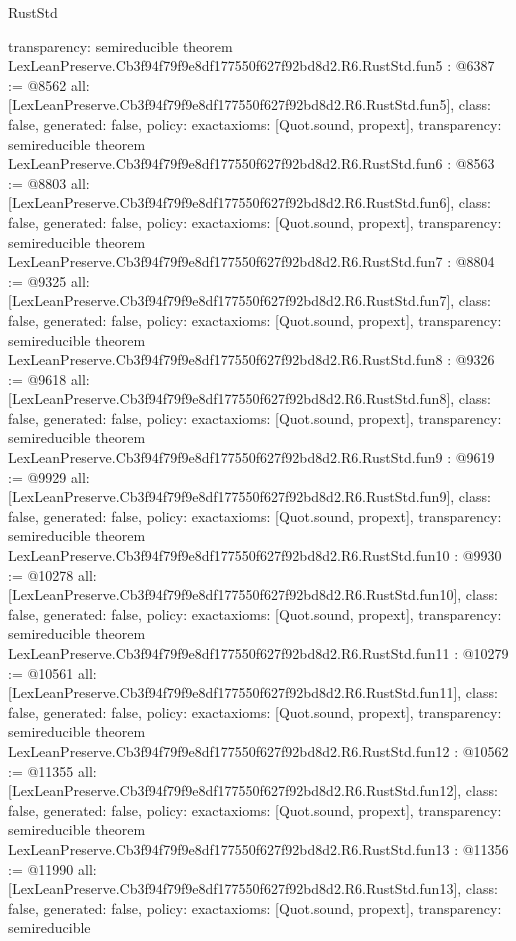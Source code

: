 \begin{lexlean}{RustStd}
\begin{coremodule}
{  transparency: semireducible
}
theorem LexLeanPreserve.Cb3f94f79f9e8df177550f627f92bd8d2.R6.RustStd.fun5 : @6387 := @8562 {
  all: [LexLeanPreserve.Cb3f94f79f9e8df177550f627f92bd8d2.R6.RustStd.fun5],
  class: false,
  generated: false,
  policy: exact{axioms: [Quot.sound, propext]},
  transparency: semireducible
}
theorem LexLeanPreserve.Cb3f94f79f9e8df177550f627f92bd8d2.R6.RustStd.fun6 : @8563 := @8803 {
  all: [LexLeanPreserve.Cb3f94f79f9e8df177550f627f92bd8d2.R6.RustStd.fun6],
  class: false,
  generated: false,
  policy: exact{axioms: [Quot.sound, propext]},
  transparency: semireducible
}
theorem LexLeanPreserve.Cb3f94f79f9e8df177550f627f92bd8d2.R6.RustStd.fun7 : @8804 := @9325 {
  all: [LexLeanPreserve.Cb3f94f79f9e8df177550f627f92bd8d2.R6.RustStd.fun7],
  class: false,
  generated: false,
  policy: exact{axioms: [Quot.sound, propext]},
  transparency: semireducible
}
theorem LexLeanPreserve.Cb3f94f79f9e8df177550f627f92bd8d2.R6.RustStd.fun8 : @9326 := @9618 {
  all: [LexLeanPreserve.Cb3f94f79f9e8df177550f627f92bd8d2.R6.RustStd.fun8],
  class: false,
  generated: false,
  policy: exact{axioms: [Quot.sound, propext]},
  transparency: semireducible
}
theorem LexLeanPreserve.Cb3f94f79f9e8df177550f627f92bd8d2.R6.RustStd.fun9 : @9619 := @9929 {
  all: [LexLeanPreserve.Cb3f94f79f9e8df177550f627f92bd8d2.R6.RustStd.fun9],
  class: false,
  generated: false,
  policy: exact{axioms: [Quot.sound, propext]},
  transparency: semireducible
}
theorem LexLeanPreserve.Cb3f94f79f9e8df177550f627f92bd8d2.R6.RustStd.fun10 : @9930 := @10278 {
  all: [LexLeanPreserve.Cb3f94f79f9e8df177550f627f92bd8d2.R6.RustStd.fun10],
  class: false,
  generated: false,
  policy: exact{axioms: [Quot.sound, propext]},
  transparency: semireducible
}
theorem LexLeanPreserve.Cb3f94f79f9e8df177550f627f92bd8d2.R6.RustStd.fun11 : @10279 := @10561 {
  all: [LexLeanPreserve.Cb3f94f79f9e8df177550f627f92bd8d2.R6.RustStd.fun11],
  class: false,
  generated: false,
  policy: exact{axioms: [Quot.sound, propext]},
  transparency: semireducible
}
theorem LexLeanPreserve.Cb3f94f79f9e8df177550f627f92bd8d2.R6.RustStd.fun12 : @10562 := @11355 {
  all: [LexLeanPreserve.Cb3f94f79f9e8df177550f627f92bd8d2.R6.RustStd.fun12],
  class: false,
  generated: false,
  policy: exact{axioms: [Quot.sound, propext]},
  transparency: semireducible
}
theorem LexLeanPreserve.Cb3f94f79f9e8df177550f627f92bd8d2.R6.RustStd.fun13 : @11356 := @11990 {
  all: [LexLeanPreserve.Cb3f94f79f9e8df177550f627f92bd8d2.R6.RustStd.fun13],
  class: false,
  generated: false,
  policy: exact{axioms: [Quot.sound, propext]},
  transparency: semireducible
}
\end{coremodule}
\end{lexlean}
